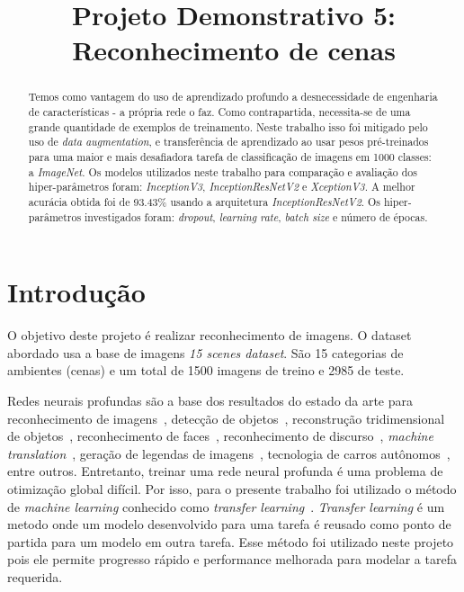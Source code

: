 \documentclass{bmvc2k}
\title{Projeto Demonstrativo 5: Reconhecimento de cenas}
\begin{document}
\begin{NoHyper}
\maketitle
\end{NoHyper}

\begin{abstract}
Temos como vantagem do uso de aprendizado profundo a desnecessidade de engenharia
de características - a própria rede o faz. Como contrapartida, necessita-se de uma grande quantidade de
exemplos de treinamento. Neste trabalho isso foi mitigado pelo uso de \textit{data augmentation}, e transferência de aprendizado ao usar pesos pré-treinados para uma maior e mais desafiadora tarefa de classificação de imagens em 1000 classes: a \textit{ImageNet}. Os modelos utilizados neste trabalho para comparação e avaliação dos hiper-parâmetros foram: \textit{InceptionV3}, \textit{InceptionResNetV2} e \textit{XceptionV3}. A melhor acurácia obtida foi de 93.43\% usando a arquitetura \textit{InceptionResNetV2}. Os hiper-parâmetros investigados foram: \textit{dropout}, \textit{learning rate}, \textit{batch size} e número de épocas. 
\end{abstract}

\section{Introdução}
\label{sec:intro}
O objetivo deste projeto é realizar reconhecimento de imagens. O dataset~\cite{lazebnik} abordado usa a base de imagens  \textit{15 scenes dataset}. São 15 categorias de ambientes (cenas) e um total de 1500 imagens de treino e 2985 de teste. 

Redes neurais profundas são a base dos resultados do estado da arte para reconhecimento de imagens~\cite{simonyan}, detecção de objetos~\cite{girshick2014rich}, reconstrução tridimensional de objetos~\cite{choy20163d}, reconhecimento de faces~\cite{deepface}, reconhecimento de discurso~\cite{graves}, \textit{machine translation}~\cite{sequence}, geração de legendas de imagens~\cite{vinyals2015show}, tecnologia de carros autônomos~\cite{huval2015empirical}, entre outros. Entretanto, treinar uma rede neural profunda é uma problema de otimização global difícil. Por isso, para o presente trabalho foi utilizado o método de \textit{machine learning} conhecido como \textit{transfer learning}~\cite{Pan2010ASO}. \textit{Transfer learning} é um metodo onde um modelo desenvolvido para uma tarefa é reusado como ponto de partida para um modelo em outra tarefa. Esse método foi utilizado neste projeto pois ele permite progresso rápido e performance melhorada para modelar a tarefa requerida. 
\end{document}
